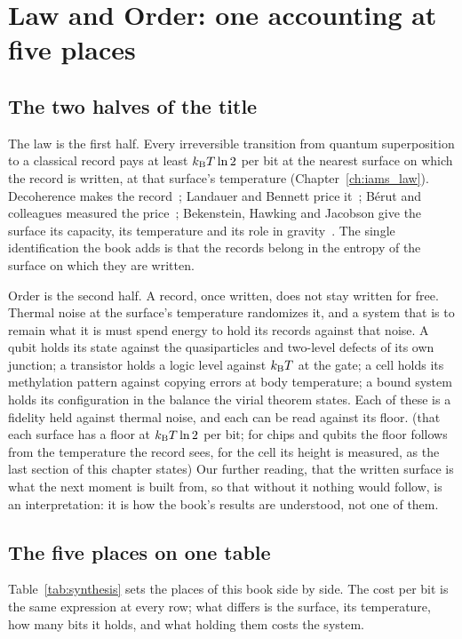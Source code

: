 \chapter{Law and Order: one accounting at five places}\label{ch:synthesis}

\section*{The two halves of the title}
The law is the first half. Every irreversible transition from quantum superposition to a classical record pays at least $k_{\mathrm B} T\ln2$ per
bit at the nearest surface on which the record is written, at that surface's temperature (Chapter~\ref{ch:iams_law}). Decoherence makes the
record~\cite{Zurek2003}; Landauer and Bennett price it~\cite{Landauer1961,Bennett1982}; B\'erut and colleagues measured the price~\cite{Berut2012};
Bekenstein, Hawking and Jacobson give the surface its capacity, its temperature and its role in gravity~\cite{Bekenstein1973,Hawking1975,Jacobson1995}.
The single identification the book adds is that the records belong in the entropy of the surface on which they are written. \conjecture

Order is the second half. A record, once written, does not stay written for free. Thermal noise at the surface's temperature randomizes it,
and a system that is to remain what it is must spend energy to hold its records against that noise. A qubit holds its state against the
quasiparticles and two-level defects of its own junction; a transistor holds a logic level against $k_{\mathrm B} T$ at the gate; a cell holds its
methylation pattern against copying errors at body temperature; a bound system holds its configuration in the balance the virial theorem
states. Each of these is a fidelity held against thermal noise, and each can be read against its floor. \derived{} (that each surface has a
floor at $k_{\mathrm B} T\ln2$ per bit; for chips and qubits the floor follows from the temperature the record sees, for the cell its height is
measured, as the last section of this chapter states) Our further reading,
that the written surface is what the next moment is built from, so that without it nothing would follow, is an interpretation: it is how the
book's results are understood, not one of them. \interp

\section{The five places on one table}
Table~\ref{tab:synthesis} sets the places of this book side by side. The cost per bit is the same expression at every row; what differs is the
surface, its temperature, how many bits it holds, and what holding them costs the system.

